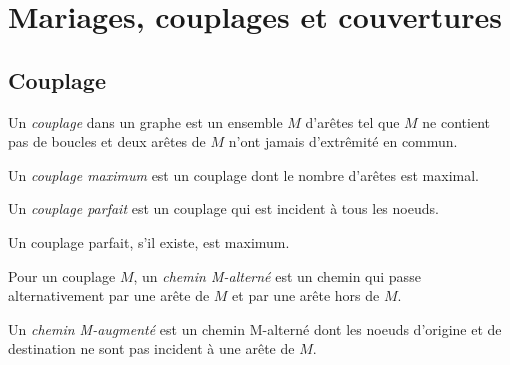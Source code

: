 \section{Mariages, couplages et couvertures}
\subsection{Couplage}
\begin{mydef}
  Un \emph{couplage} dans un graphe est un ensemble $M$ d’arêtes tel que $M$ ne contient pas de boucles et deux arêtes de $M$ n’ont jamais d’extrêmité en commun.
\end{mydef}

\begin{mydef}
  Un \emph{couplage maximum} est un couplage dont le nombre d’arêtes est maximal.
\end{mydef}

\begin{mydef}
  Un \emph{couplage parfait} est un couplage qui est incident à tous les noeuds.
\end{mydef}

\begin{myrem}
  Un couplage parfait, s’il existe, est maximum.
\end{myrem}

\begin{mydef}
  Pour un couplage $M$, un \emph{chemin M-alterné} est un chemin qui passe alternativement par une arête de $M$ et par une arête hors de $M$.
\end{mydef}

\begin{mydef}
  Un \emph{chemin M-augmenté} est un chemin M-alterné dont les noeuds d’origine et de destination ne sont pas incident à une arête de $M$.
\end{mydef}

